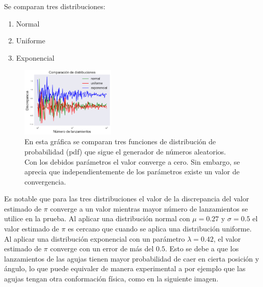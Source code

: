 \documentclass{rbf}
\begin{document}
Se comparan tres distribuciones:
\begin{enumerate}
    \item Normal
    \item Uniforme
    \item Exponencial
\end{enumerate}

\begin{figure}[tbp!]
 \centering
  \includegraphics[width=0.4\textwidth]{figures/dist.png}
	\caption{En esta gráfica se comparan tres funciones de distribución de probabilidad (pdf) que sigue el generador de números aleatorios. Con los debidos parámetros el valor converge a cero. Sin embargo, se aprecia que independientemente de los parámetros existe un valor de convergencia. }
 \label{buff5}
\end{figure}

Es notable que para las tres distribuciones el valor de la discrepancia del valor estimado de $\pi$ converge a un valor mientras mayor número de lanzamientos se utilice en la prueba. Al aplicar una distribución normal con $\mu=0.27$ y  $\sigma=0.5$ el valor estimado de $\pi$ es cercano que cuando se aplica una distribución uniforme. Al aplicar una distribución exponencial con un parámetro $\lambda=0.42$, el valor estimado de $\pi$ converge con un error de más del $0.5$. Esto se debe a que los lanzamientos de las agujas tienen mayor probabilidad de caer en cierta posición y ángulo, lo que puede equivaler de manera experimental a por ejemplo que las agujas tengan otra conformación física, como en la siguiente imagen.
\end{document}
